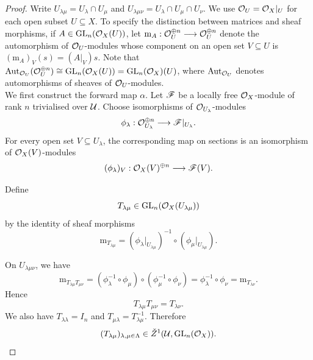 \documentclass[12pt,a4paper]{article}
\begin{document}
\begin{proof}
    Write $U_{\lambda\mu}=U_\lambda\cap U_\mu$ and
    $U_{\lambda\mu\nu}=U_\lambda\cap U_\mu\cap U_\nu$.
    We use $\mathcal{O}_U=\mathcal{O}_X|_U$ for each open subset $U\subseteq X$. To specify the distinction between matrices and sheaf morphisms, if $A\in\operatorname{GL}_n(\mathcal{O}_X(U))$, let $\mathrm m_A:\mathcal{O}_U^{\oplus n}\longrightarrow \mathcal{O}_U^{\oplus n}$ denote the automorphism of $\mathcal{O}_U$-modules whose component on an open set $V\subseteq U$ is $(\mathrm m_A)_V(s)=(A|_V)s$. Note that $\operatorname{Aut}_{\mathcal{O}_U}(\mathcal{O}_U^{\oplus n})
        \cong \operatorname{GL}_n(\mathcal{O}_X(U))
        =\operatorname{GL}_n(\mathcal{O}_X)(U)$, where $\operatorname{Aut}_{\mathcal{O}_U}$ denotes automorphisms of sheaves of
    $\mathcal{O}_U$-modules. \\

    We first construct the forward map $\alpha$.
    Let $\mathscr{F}$ be a locally free $\mathcal{O}_X$-module of rank $n$ trivialised over $\mathcal{U}$. Choose isomorphisms of
    $\mathcal{O}_{U_\lambda}$-modules
    \[
        \phi_\lambda:
        \mathcal{O}_{U_\lambda}^{\oplus n}
        \longrightarrow \mathscr{F}|_{U_\lambda}.
    \]
    For every open set $V\subseteq U_\lambda$, the corresponding
    map on sections is an isomorphism of $\mathcal{O}_X(V)$-modules
    \[
        (\phi_\lambda)_V:
        \mathcal{O}_X(V)^{\oplus n}\longrightarrow \mathscr{F}(V).
    \]

    Define
    \[
        T_{\lambda\mu}
        \in \operatorname{GL}_n(\mathcal{O}_X(U_{\lambda\mu}))
    \]
    by the identity of sheaf morphisms
    \[
        \mathrm m_{T_{\lambda\mu}}
        =
        (\phi_\lambda|_{U_{\lambda\mu}})^{-1}
        \circ
        (\phi_\mu|_{U_{\lambda\mu}}).
    \]

    On $U_{\lambda\mu\nu}$, we have
    \[
        \mathrm m_{T_{\lambda\mu}T_{\mu\nu}}
        =
        (\phi_\lambda^{-1}\circ\phi_\mu)
        \circ
        (\phi_\mu^{-1}\circ\phi_\nu)
        =
        \phi_\lambda^{-1}\circ\phi_\nu
        =
        \mathrm m_{T_{\lambda\nu}}.
    \]
    Hence
    \[
        T_{\lambda\mu}T_{\mu\nu}=T_{\lambda\nu}.
    \]
    We also have $T_{\lambda\lambda}=I_n$ and
    $T_{\mu\lambda}=T_{\lambda\mu}^{-1}$. Therefore
    \[
        (T_{\lambda\mu})_{\lambda,\mu\in\Lambda}
        \in\check Z^1(\mathcal{U},\operatorname{GL}_n(\mathcal{O}_X)).
    \]


\end{proof}
\end{document}
